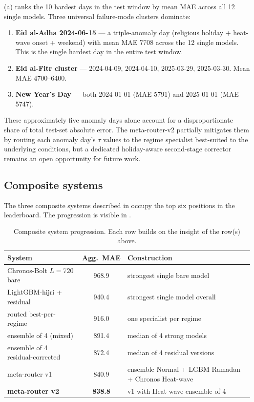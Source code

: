 \documentclass[10pt, a4paper, twocolumn]{article}
\begin{document}
(a) ranks the 10 hardest days in the test
window by mean MAE across all 12 single models. Three universal
failure-mode clusters dominate:

\begin{enumerate}\setlength\itemsep{1pt}
  \item \textbf{Eid al-Adha 2024-06-15} --- a triple-anomaly day
    (religious holiday + heat-wave onset + weekend) with mean
    MAE \num{7708} across the 12 single models. This is the
    single hardest day in the entire test window.
  \item \textbf{Eid al-Fitr cluster} --- 2024-04-09, 2024-04-10,
    2025-03-29, 2025-03-30. Mean MAE 4700--6400.
  \item \textbf{New Year's Day} --- both 2024-01-01
    (MAE \num{5791}) and 2025-01-01 (MAE \num{5747}).
\end{enumerate}

These approximately five anomaly days alone account for a
disproportionate share of total test-set absolute error. The
meta-router-v2 partially mitigates them by routing each anomaly
day's $\tau$ values to the regime specialist best-suited to the
underlying conditions, but a dedicated holiday-aware second-stage
corrector remains an open opportunity for future work.

\subsection{Composite systems}
\label{sec:results:composites}

The three composite systems described in
 occupy the top six positions in
the leaderboard. The progression is visible in
.

\begin{table}[!t]
  \centering
  \caption{Composite system progression. Each row builds on the
    insight of the row(s) above.}
  \label{tab:composites}
  \small
  \begin{tabular}{l S[table-format=4.1] l}
    \toprule
    System & {Agg.\ MAE} & Construction \\
    \midrule
    Chronos-Bolt $L{=}720$ bare        & 968.9 & strongest single bare model \\
    LightGBM-hijri + residual          & 940.4 & strongest single model overall \\
    routed best-per-regime             & 916.0 & one specialist per regime \\
    ensemble of 4 (mixed)              & 891.4 & median of 4 strong models \\
    ensemble of 4 residual-corrected   & 872.4 & median of 4 residual versions \\
    meta-router v1                     & 840.9 & ensemble Normal + LGBM Ramadan + Chronos Heat-wave \\
    \textbf{meta-router v2}            & \textbf{838.8} & v1 with Heat-wave ensemble of 4 \\
    \bottomrule
  \end{tabular}
\end{table}
\end{document}
